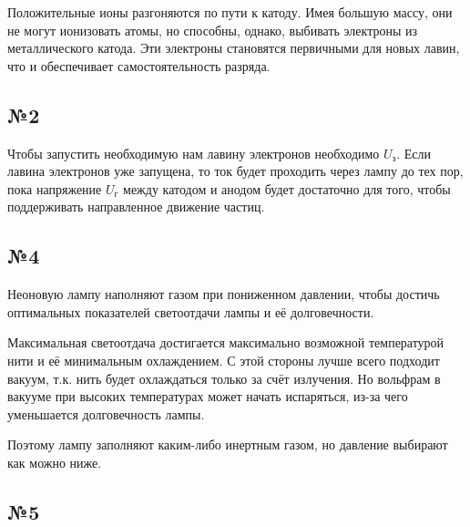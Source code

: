 Положительные ионы разгоняются по пути к катоду. Имея большую массу, они не могут ионизовать атомы, но способны, однако, выбивать электроны из металлического катода. Эти электроны становятся первичными для новых лавин, что и обеспечивает самостоятельность разряда.
\subsection{№2}
Чтобы запустить необходимую нам лавину электронов необходимо $U_{\text{з}}$. Если лавина электронов уже запущена, то ток будет проходить через лампу до тех пор, пока напряжение $U_{\text{г}}$ между катодом и анодом будет достаточно для того, чтобы поддерживать направленное движение частиц. 
\subsection{№4}
Неоновую лампу наполняют газом при пониженном давлении, чтобы достичь оптимальных показателей светоотдачи лампы и её долговечности.

Максимальная светоотдача достигается максимально возможной температурой нити и её минимальным охлаждением. С этой стороны лучше всего подходит вакуум, т.к. нить будет охлаждаться только за счёт излучения.
Но вольфрам в вакууме при высоких температурах может начать испаряться, из-за чего уменьшается долговечность лампы.

Поэтому лампу заполняют каким-либо инертным газом, но давление выбирают как можно ниже.
\subsection{№5}


